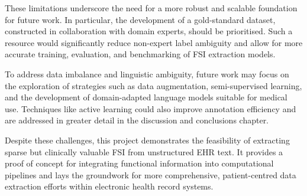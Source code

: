 These limitations underscore the need for a more robust and scalable foundation for future work. In particular, the development of a gold-standard dataset, constructed in collaboration with domain experts, should be prioritised. Such a resource would significantly reduce non-expert label ambiguity and allow for more accurate training, evaluation, and benchmarking of FSI extraction models. \medskip

To address data imbalance and linguistic ambiguity, future work may focus on the exploration of strategies such as data augmentation, semi-supervised learning, and the development of domain-adapted language models suitable for medical use. Techniques like active learning could also improve annotation efficiency and are addressed in greater detail in the discussion and conclusions chapter.\medskip

Despite these challenges, this project demonstrates the feasibility of extracting sparse but clinically valuable FSI from unstructured EHR text. It provides a proof of concept for integrating functional information into computational pipelines and lays the groundwork for more comprehensive, patient-centred data extraction efforts within electronic health record systems.